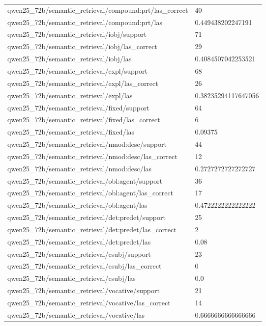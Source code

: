 \begin{tabular}{ll}
qwen25\_72b/semantic\_retrieval/compound:prt/las\_correct & 40 \\
qwen25\_72b/semantic\_retrieval/compound:prt/las & 0.449438202247191 \\
qwen25\_72b/semantic\_retrieval/iobj/support & 71 \\
qwen25\_72b/semantic\_retrieval/iobj/las\_correct & 29 \\
qwen25\_72b/semantic\_retrieval/iobj/las & 0.4084507042253521 \\
qwen25\_72b/semantic\_retrieval/expl/support & 68 \\
qwen25\_72b/semantic\_retrieval/expl/las\_correct & 26 \\
qwen25\_72b/semantic\_retrieval/expl/las & 0.38235294117647056 \\
qwen25\_72b/semantic\_retrieval/fixed/support & 64 \\
qwen25\_72b/semantic\_retrieval/fixed/las\_correct & 6 \\
qwen25\_72b/semantic\_retrieval/fixed/las & 0.09375 \\
qwen25\_72b/semantic\_retrieval/nmod:desc/support & 44 \\
qwen25\_72b/semantic\_retrieval/nmod:desc/las\_correct & 12 \\
qwen25\_72b/semantic\_retrieval/nmod:desc/las & 0.2727272727272727 \\
qwen25\_72b/semantic\_retrieval/obl:agent/support & 36 \\
qwen25\_72b/semantic\_retrieval/obl:agent/las\_correct & 17 \\
qwen25\_72b/semantic\_retrieval/obl:agent/las & 0.4722222222222222 \\
qwen25\_72b/semantic\_retrieval/det:predet/support & 25 \\
qwen25\_72b/semantic\_retrieval/det:predet/las\_correct & 2 \\
qwen25\_72b/semantic\_retrieval/det:predet/las & 0.08 \\
qwen25\_72b/semantic\_retrieval/csubj/support & 23 \\
qwen25\_72b/semantic\_retrieval/csubj/las\_correct & 0 \\
qwen25\_72b/semantic\_retrieval/csubj/las & 0.0 \\
qwen25\_72b/semantic\_retrieval/vocative/support & 21 \\
qwen25\_72b/semantic\_retrieval/vocative/las\_correct & 14 \\
qwen25\_72b/semantic\_retrieval/vocative/las & 0.6666666666666666 \\

\end{tabular}
